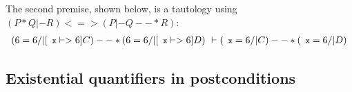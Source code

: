 \documentclass[acmsmall,screen]{acmart}
\newcommand{\li}[1]{{\texttt{\small #1}}}
\newcommand{\defeq}{\mathbin{\stackrel{\triangle}{=}}}
\newcommand{\p}[1]{\ensuremath{\mathsf{#1}}} \newcommand{\m}[1]{\ensuremath{\mathit{#1}}} \newcommand{\ma}[1]{\ensuremath{\mathcal{#1}}} \let\ramify\lightning
\newcommand{\infrulestyle}[1]{\textsc{#1}}
\newcommand{\infrule}[4]{\inferrule*[lab=\infrulestyle{#1},right=$\mathrlap{#4}$]{#2}{#3}}
\begin{document}
{The second premise, shown below, is a tautology using $(P * Q |- R) <=> (P |- Q --* R)$:
\vspace*{-0.75ex}
\begin{equation}
\label{eqn:sndpremisetauto}
\begin{array}{l}
(6 = 6 /| [\li{x} |-> 6]C) --* (6 = 6 /| [\li{x} |-> 6]D) ~ |- (\li{x} = 6 /| C) --* (\li{x} = 6 /| D)
\end{array}
\vspace*{-0.75ex}
\end{equation}

\subsection{Existential quantifiers in postconditions}
\label{sec:existentials}

}
\end{document}

